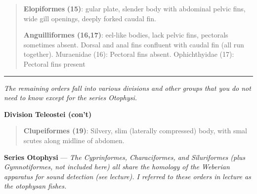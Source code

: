 \documentclass[12pt, hidelinks]{exam}
\begin{document}
\begin{quote}
\textbf{Elopiformes} \textbf{(15)}: gular plate, slender body with
abdominal pelvic fins, wide gill openings, deeply forked caudal fin.

\textbf{Anguilliformes (16,17)}: eel-like bodies, lack pelvic fins,
pectorals sometimes absent. Dorsal and anal fins confluent with caudal
fin (all run together). Muraenidae (16): Pectoral fins absent.
Ophichthyidae (17): Pectoral fins present
\end{quote}

\smallskip

\hrule

\textit{The remaining orders fall into various divisions and other groups that you do not need to know except for the series Otophysi.}

\textbf{Division Teleostei (con't)}

\begin{quote}
\textbf{Clupeiformes (19)}: Silvery, slim (laterally compressed) body,
with smal scutes along midline of abdomen.
\end{quote}

\textbf{Series Otophysi} — \textit{The Cyprinformes, Characiformes, and Siluriformes (plus Gymnotiformes, not included here) all share the homology of the Weberian apparatus for sound detection (see lecture). I referred to these orders in lecture as the otophysan fishes.  }
\end{document}
